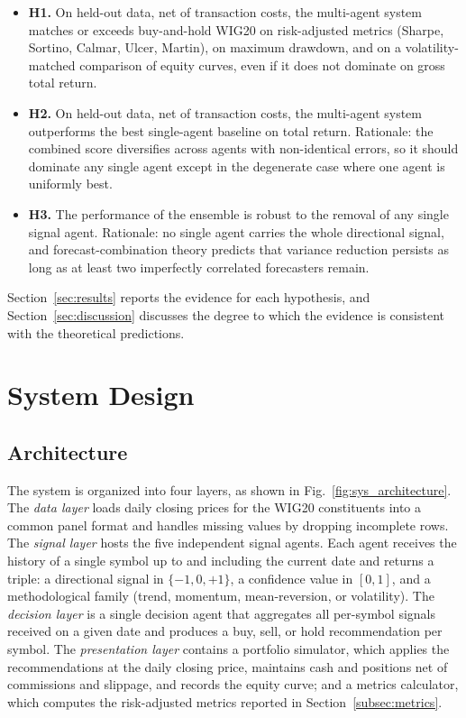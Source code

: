 \documentclass{ieeeaccess}
\begin{document}
\begin{itemize}
\item \textbf{H1.} On held-out data, net of transaction costs, the multi-agent system matches or exceeds buy-and-hold WIG20 on risk-adjusted metrics (Sharpe, Sortino, Calmar, Ulcer, Martin), on maximum drawdown, and on a volatility-matched comparison of equity curves, even if it does not dominate on gross total return.
\item \textbf{H2.} On held-out data, net of transaction costs, the multi-agent system outperforms the best single-agent baseline on total return. Rationale: the combined score diversifies across agents with non-identical errors, so it should dominate any single agent except in the degenerate case where one agent is uniformly best.
\item \textbf{H3.} The performance of the ensemble is robust to the removal of any single signal agent. Rationale: no single agent carries the whole directional signal, and forecast-combination theory predicts that variance reduction persists as long as at least two imperfectly correlated forecasters remain.
\end{itemize}

Section~\ref{sec:results} reports the evidence for each hypothesis, and Section~\ref{sec:discussion} discusses the degree to which the evidence is consistent with the theoretical predictions.

\section{System Design}
\label{sec:system}

\subsection{Architecture}

The system is organized into four layers, as shown in Fig.~\ref{fig:sys_architecture}. The \emph{data layer} loads daily closing prices for the WIG20 constituents into a common panel format and handles missing values by dropping incomplete rows. The \emph{signal layer} hosts the five independent signal agents. Each agent receives the history of a single symbol up to and including the current date and returns a triple: a directional signal in $\{-1, 0, +1\}$, a confidence value in $[0, 1]$, and a methodological family (trend, momentum, mean-reversion, or volatility). The \emph{decision layer} is a single decision agent that aggregates all per-symbol signals received on a given date and produces a buy, sell, or hold recommendation per symbol. The \emph{presentation layer} contains a portfolio simulator, which applies the recommendations at the daily closing price, maintains cash and positions net of commissions and slippage, and records the equity curve; and a metrics calculator, which computes the risk-adjusted metrics reported in Section~\ref{subsec:metrics}.
\end{document}

